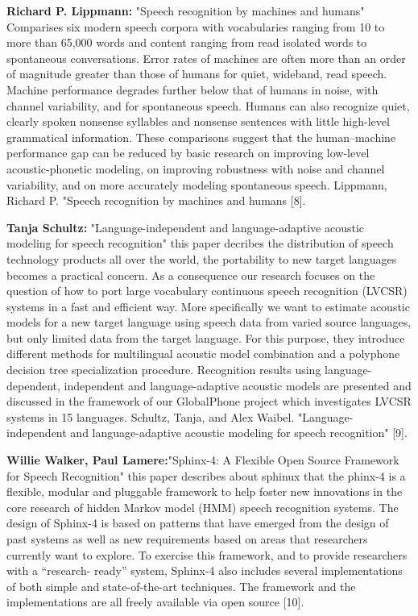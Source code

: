 \documentclass[12pt,a4paper,oneside]{memoir}
\begin{document}
\textbf{Richard P. Lippmann:} "Speech recognition by machines and humans" Comparises six modern speech corpora with vocabularies ranging from 10 to more than 65,000 words and content ranging from read isolated words to spontaneous conversations. Error rates of machines are often more than an order of magnitude greater than those of
humans for quiet, wideband, read speech. Machine performance degrades further below that of humans in noise, with
channel variability, and for spontaneous speech. Humans can also recognize quiet, clearly spoken nonsense syllables and
nonsense sentences with little high-level grammatical information. These comparisons suggest that the human–machine
performance gap can be reduced by basic research on improving low-level acoustic-phonetic modeling, on improving
robustness with noise and channel variability, and on more accurately modeling spontaneous speech.  Lippmann, Richard P. "Speech recognition by machines and humans [8].

\textbf{Tanja Schultz:} "Language-independent and language-adaptive acoustic modeling for speech recognition" this paper decribes  the distribution of speech technology products all over the world, the portability to new target languages
becomes a practical concern. As a consequence our research focuses on the question of how to port large
vocabulary continuous speech recognition (LVCSR) systems in a fast and efficient way. More specifically we want
to estimate acoustic models for a new target language using speech data from varied source languages, but only
limited data from the target language. For this purpose, they introduce different methods for multilingual acoustic
model combination and a polyphone decision tree specialization procedure. Recognition results using language-
dependent, independent and language-adaptive acoustic models are presented and discussed in the framework of
our GlobalPhone project which investigates LVCSR systems in 15 languages.   Schultz, Tanja, and Alex Waibel. "Language-independent and language-adaptive acoustic modeling for speech recognition" [9].

\textbf{Willie Walker, Paul Lamere:}"Sphinx-4: A Flexible Open Source Framework for Speech Recognition" this paper describes about sphinux that the phinx-4 is a flexible, modular and pluggable framework to help foster new innovations
in the core research of hidden Markov model (HMM) speech recognition systems. The
design of Sphinx-4 is based on patterns that have emerged from the design of past
systems as well as new requirements based on areas that researchers currently want
to explore. To exercise this framework, and to provide researchers with a “research-
ready” system, Sphinx-4 also includes several implementations of both simple and
state-of-the-art techniques. The framework and the implementations are all freely
available via open source [10].
\end{document}
